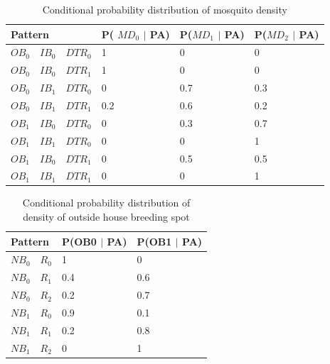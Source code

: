 \documentclass[review]{elsarticle}
\begin{document}


	
	\begin{table}[!htbp]
		\centering
		\normalsize
		\begin{tabular}{|l|l|l|l|l|l|}
			\hline
			\multicolumn{3}{|l|}{Pattern}	 & P( $MD_0$ $\mid$ PA) & P($MD_1$ $\mid$ PA) & P($MD_2$  $\mid$ PA)\\
			\hline
			$OB_0$ & $IB_0$ & $DTR_0$ & 1 & 0 & 0\\
			\hline
			$OB_0$ & $IB_0$ & $DTR_1$ & 1 & 0 & 0\\
			\hline
			$OB_0$ & $IB_1$ & $DTR_0$ & 0 & 0.7 & 0.3\\
			\hline
			$OB_0$ & $IB_1$ & $DTR_1$ & 0.2 & 0.6 & 0.2\\
			\hline
			$OB_1$ & $IB_0$ & $DTR_0$ & 0 & 0.3 & 0.7\\
			\hline
			$OB_1$ & $IB_1$ & $DTR_0$ & 0 & 0 & 1\\
			\hline
			$OB_1$ & $IB_0$ & $DTR_1$ & 0 & 0.5 & 0.5\\
			\hline
			$OB_1$ & $IB_1$ & $DTR_1$ & 0 & 0 & 1\\
			\hline
		\end{tabular}
		\caption{ Conditional probability distribution of mosquito density}
	\end{table}
	
	
	\begin{table}[!htbp]
		\centering
		\normalsize
		\begin{tabular}{|l|l|l|l|}
			\hline
			\multicolumn{2}{|l|}{Pattern}  & P(OB0 $\mid$ PA) & P(OB1 $\mid$ PA)\\
			\hline
			$NB_0$ & $R_0$ & 1 & 0\\
			\hline
			$NB_0$ & $R_1$ & 0.4 & 0.6\\
			\hline
			$NB_0$ & $R_2$ & 0.2 & 0.7\\
			\hline
			$NB_1$ & $R_0$ & 0.9 & 0.1\\
			\hline
			$NB_1$ & $R_1$ & 0.2 & 0.8\\
			\hline
			$NB_1$ & $R_2$ & 0 & 1\\
			\hline
		\end{tabular}
		\caption{Conditional probability distribution of density of outside house breeding spot}
	\end{table}
	
\end{document}
